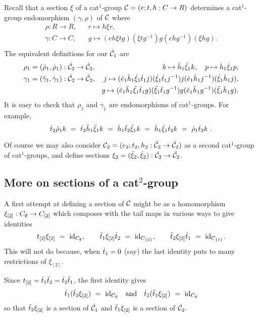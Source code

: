 \bigskip
Recall that a section $\xi$ of a cat$^1$-group 
$\mathcal{C} = (e;t,h : C \to R)$ determines a cat$^1$-group endomorphism 
$(\gamma,\rho)$ of $\mathcal{C}$ where
\begin{eqnarray*}
  \rho : R \to R, && r \mapsto h \xi r, \\
\gamma : C \to C, && g \mapsto (eh \xi tg)(\xi tg^{-1})g(ehg^{-1})(\xi hg). \\
\end{eqnarray*}
The equivalent definitions for our $\dot{\mathcal{C}}_1$ are
\begin{eqnarray*}
\rho_1 = (\ddot{\rho}_1,\dot{\rho}_1): \dot{\mathcal{C}}_2 \to \dot{\mathcal{C}}_2, 
  & &  k \mapsto \ddot{h}_1 \ddot{\xi}_1 k, \quad
       p \mapsto \dot{h}_1 \dot{\xi}_1 p, \\
\gamma_1 = (\ddot{\gamma}_1,\dot{\gamma}_1) : \ddot{\mathcal{C}}_2 \to \ddot{\mathcal{C}}_2, 
  & &  j \mapsto (\dot{e}_1\dot{h}_1\dot{\xi}_1\dot{t}_1 j)(\dot{\xi}_1\dot{t}_1 j^{-1})j
                 (\dot{e}_1\dot{h}_1 j^{-1})(\dot{\xi}_1\dot{h}_1 j), \\
  & &  g \mapsto (\ddot{e}_1\ddot{h}_1\ddot{\xi}_1\ddot{t}_1 g)(\ddot{\xi}_1\ddot{t}_1 g^{-1})g
                 (\ddot{e}_1\ddot{h}_1 g^{-1})(\ddot{\xi}_1\ddot{h}_1 g).
\end{eqnarray*}
It is easy to check that $\rho_1$ and $\gamma_1$ are endomorphisms 
of cat$^1$-groups.  For example,
$$
\dot{t}_2\ddot{\rho}_1 k ~=~
\dot{t}_2\ddot{h}_1\ddot{\xi}_1 k ~=~
\dot{h}_1\ddot{t}_2\ddot{\xi}_1 k ~=~
\dot{h}_1\dot{\xi}_1\dot{t}_2 k ~=~
\dot{\rho}_1\dot{t}_2 k~.
$$

Of course we may also consider 
$\mathcal{C}_2 = (e_2;t_2,h_2 : \ddot{\mathcal{C}}_2 \to \dot{\mathcal{C}}_2)$ 
as a second cat$^1$-group of cat$^1$-groups, and define 
sections $\xi_2 = (\ddot{\xi}_2,\dot{\xi}_2) : \dot{\mathcal{C}}_2 \to \ddot{\mathcal{C}}_2$.



\subsection{More on sections of a cat$^2$-group}

A first attempt at defining a section of $\mathcal{C}$ 
might be as a homomorphism $\xi_{[2]} : C_{\emptyset} \to C_{[2]}$ 
which composes with the tail maps in various ways to give identities
$$
t_{[2]}\xi_{[2]} ~=~ \mathrm{id}_{C_{\emptyset}}, \qquad
\ddot{t}_1\xi_{[2]}\dot{t}_2 ~=~ \mathrm{id}_{C_{\{2\}}}, \qquad
\ddot{t}_2\xi_{[2]}\dot{t}_1 ~=~ \mathrm{id}_{C_{\{1\}}}.
$$
This will not do because, when $\dot{t}_1 = 0$ (say)
the last identity puts to many restrictions of $\xi_{[2]}$.

\noindent
Since $t_{[2]} = \dot{t}_1\ddot{t}_2 = \dot{t}_2\ddot{t}_1$, the first identity gives 
$$
\dot{t}_1(\ddot{t}_2\xi_{[2]})  ~=~ \mathrm{id}_{C_{\emptyset}}
\quad\mbox{and}\quad
\dot{t}_2(\ddot{t}_1\xi_{[2]})  ~=~ \mathrm{id}_{C_{\emptyset}}
$$
so that $\ddot{t}_2\xi_{[2]}$ is a section of $\dot{\mathcal{C}}_1$ 
and $\ddot{t}_1\xi_{[2]}$ is a section of $\dot{\mathcal{C}}_2$.

